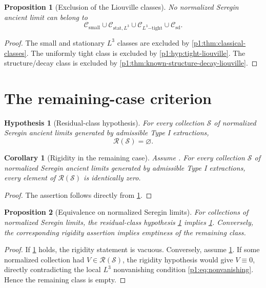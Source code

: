 \documentclass[11pt]{amsart}
\theoremstyle{plain}
\newtheorem{proposition}[proposition]{Proposition}
\newtheorem{corollary}[corollary]{Corollary}
\newtheorem{hypothesis}[hypothesis]{Hypothesis}
\theoremstyle{definition}
\theoremstyle{remark}
\numberwithin{equation}{section}
\newcommand{\calS}{\mathcal S}
\newcommand{\calR}{\mathcal R}
\newcommand{\calC}{\mathcal C}
\begin{document}
\begin{proposition}[Exclusion of the Liouville classes]
\label{p1:prop:known-class-exclusion}
No normalized Seregin ancient limit can belong to
\[
   \calC_{\mathrm{small}}
   \cup
   \calC_{\mathrm{stat},L^3}
   \cup
   \calC_{L^3\mathrm{-tight}}
   \cup
   \calC_{\mathrm{sd}}.
\]
\end{proposition}

\begin{proof}
The small and stationary \(L^3\) classes are excluded by
\cref{p1:thm:classical-classes}.  The uniformly tight class is excluded by
\cref{p1:hyp:tight-liouville}.  The structure/decay class is excluded by
\cref{p1:thm:known-structure-decay-liouville}.
\end{proof}

\section{The remaining-case criterion}\label{p1:sec:criterion}

\begin{hypothesis}[Residual-class hypothesis]\label{p1:hyp:no-remainder}
For every collection \(\calS\) of normalized Seregin ancient limits generated
by admissible Type I extractions,
\[
   \calR(\calS)=\varnothing .
\]
\end{hypothesis}

\begin{corollary}[Rigidity in the remaining case]\label{p1:hyp:remainder-rigidity}
Assume .
For every collection \(\calS\) of normalized Seregin ancient limits generated
by admissible Type I extractions, every element of \(\calR(\calS)\) is
identically zero.
\end{corollary}

\begin{proof}
The assertion follows directly from \cref{p1:hyp:no-remainder}.
\end{proof}

\begin{proposition}[Equivalence on normalized Seregin limits]
\label{p1:prop:remainder-equivalence}
For collections of normalized Seregin limits, the residual-class hypothesis
\cref{p1:hyp:no-remainder} implies \cref{p1:hyp:remainder-rigidity}.  Conversely,
the corresponding rigidity assertion implies emptiness of the remaining class.
\end{proposition}

\begin{proof}
If \cref{p1:hyp:no-remainder} holds, the rigidity statement is vacuous.
Conversely, assume \cref{p1:hyp:remainder-rigidity}.  If some normalized
collection had \(V\in\calR(\calS)\), the rigidity hypothesis would give
\(V\equiv0\), directly contradicting the local \(L^3\) nonvanishing condition
\eqref{p1:eq:nonvanishing}.  Hence the remaining class is empty.
\end{proof}
\end{document}
